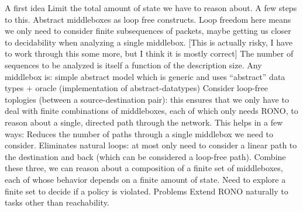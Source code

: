 \begin{outline}
\1 A first idea
    \2 Limit the total amount of state we have to reason about. A few steps to this.
    \2 Abstract middleboxes as loop free constructs. Loop freedom here means we only need to consider finite subsequences of packets, maybe getting us closer to decidability when analyzing a single middlebox. [This is actually risky, I have to work through this some more, but I think it is mostly correct] The number of sequences to be analyzed is itself a function of the description size.
        \3 Any middlebox is: simple abstract model which is generic and uses ``abstract'' data types + oracle (implementation of abstract-datatypes)
    \2 Consider loop-free toplogies (between a source-destination pair): this ensures that we only have to deal with finite combinations of middleboxes, each of which only needs 
    \2 RONO, to reason about a single, directed path through the network. This helps in a few ways:
        \3 Reduces the number of paths through a single middlebox we need to consider.
        \3 Eliminates natural loops: at most only need to consider a linear path to the destination and back (which can be considered a loop-free path).
    \2 Combine these three, we can reason about a composition of a finite set of middleboxes, each of whose behavior depends on a finite amount of state. Need to explore a finite set to decide if a policy is violated.
\1 Problems
    \2 Extend RONO naturally to tasks other than reachability.
\end{outline}